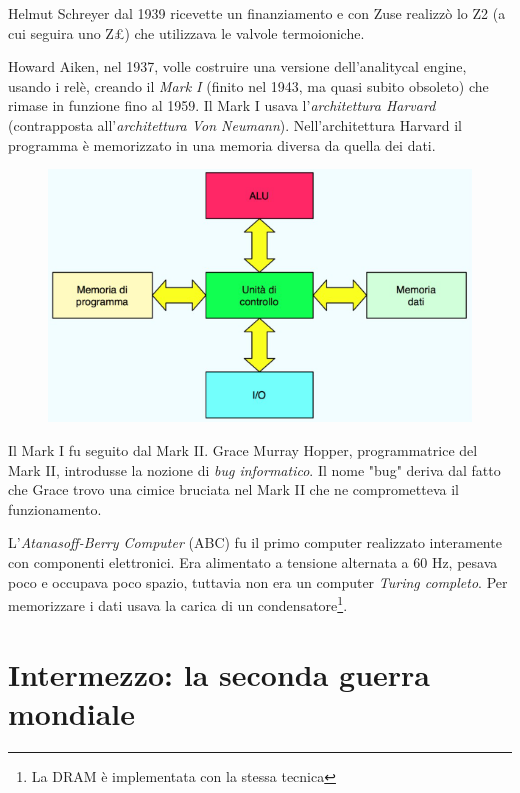 Helmut Schreyer dal 1939 ricevette un finanziamento e con Zuse realizzò lo Z2 (a cui seguira uno Z£) che utilizzava le valvole termoioniche.

Howard Aiken, nel 1937, volle costruire una versione dell'analitycal engine, usando i relè, creando il \textit{Mark I} (finito nel 1943, ma quasi subito obsoleto) che rimase in funzione fino al 1959. Il Mark I usava l'\textit{architettura Harvard} (contrapposta all'\textit{architettura Von Neumann}). Nell'architettura Harvard il programma è memorizzato in una memoria diversa da quella dei dati.

\begin{figure}
    \centering
    \includegraphics[scale = 0.5]{images/storia arch/Harvard.png}
\end{figure}

Il Mark I fu seguito dal Mark II. Grace Murray Hopper, programmatrice del Mark II, introdusse la nozione di \textit{bug informatico}. Il nome "bug" deriva dal fatto che Grace trovo una cimice bruciata nel Mark II che ne comprometteva il funzionamento.

L'\textit{Atanasoff-Berry Computer} (ABC) fu il primo computer realizzato interamente con componenti elettronici. Era alimentato a tensione alternata a 60 Hz, pesava poco e occupava poco spazio, tuttavia non era un computer \textit{Turing completo}. Per memorizzare i dati usava la carica di un condensatore\footnote{La DRAM è implementata con la stessa tecnica}.


\section{Intermezzo: la seconda guerra mondiale}


